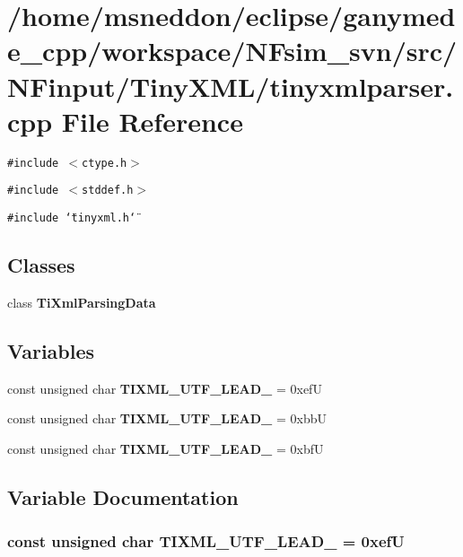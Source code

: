 \section{/home/msneddon/eclipse/ganymede\_\-cpp/workspace/NFsim\_\-svn/src/NFinput/TinyXML/tinyxmlparser.cpp File Reference}
\label{tinyxmlparser_8cpp}


{\tt \#include $<$ctype.h$>$}\par
{\tt \#include $<$stddef.h$>$}\par
{\tt \#include \char`\"{}tinyxml.h\char`\"{}}\par
\subsection*{Classes}
\begin{CompactItemize}
\item 
class {\bf TiXmlParsingData}
\end{CompactItemize}
\subsection*{Variables}
\begin{CompactItemize}
\item 
const unsigned char {\bf TIXML\_\-UTF\_\-LEAD\_} = 0xefU
\item 
const unsigned char {\bf TIXML\_\-UTF\_\-LEAD\_} = 0xbbU
\item 
const unsigned char {\bf TIXML\_\-UTF\_\-LEAD\_} = 0xbfU
\end{CompactItemize}


\subsection{Variable Documentation}
\subsubsection{\setlength{\rightskip}{0pt plus 5cm}const unsigned char {\bf TIXML\_\-UTF\_\-LEAD\_} = 0xefU}\label{tinyxmlparser_8cpp_37999e32163e2a3280bc0b8e1999774e}


